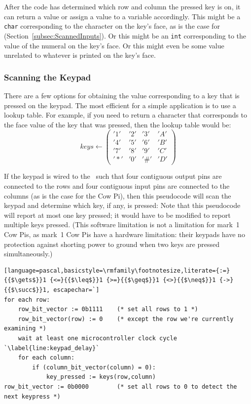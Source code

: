 After the code has determined which row and column the pressed key is on, it can return a value or assign a value to a variable accordingly.
This might be a \lstinline{char} corresponding to the character on the key's face, as is the case for  (Section~\ref{subsec:ScannedInputs}).
Or this might be an \lstinline{int} corresponding to the value of the numeral on the key's face.
Or this might even be some value unrelated to whatever is printed on the key's face.

\subsubsection{Scanning the Keypad}

There are a few options for obtaining the value corresponding to a key that is pressed on the keypad.
The most efficient for a simple application is to use a lookup table.
For example, if you need to return a character that corresponds to the face value of the key that was pressed, then the lookup table would be:
\[
    keys \gets
    \left(\begin{array}{cccc}
              '1' & '2' & '3' & 'A' \\
              '4' & '5' & '6' & 'B' \\
              '7' & '8' & '9' & 'C' \\
              '*' & '0' & '\#' & 'D'
    \end{array}\right)
\]

If the keypad is wired to the \mcuboard\ such that four contiguous output pins are connected to the rows and four contiguous input pins are connected to the columns (as is the case for the Cow Pi), then this pseudocode will scan the keypad and determine which key, if any, is pressed:
Note that this pseudocode will report at most one key pressed;
it would have to be modified to report multiple keys pressed.
(This software limitation is not a limitation for mark~1 Cow Pis, as mark~1 Cow Pis have a hardware limitation:
their keypads have no protection against shorting power to ground when two keys are pressed simultaneously.)

\begin{lstlisting}[language=pascal,basicstyle=\rmfamily\footnotesize,literate={:=}{{$\gets$}}1 {<=}{{$\leq$}}1 {>=}{{$\geq$}}1 {<>}{{$\neq$}}1 {->}{{$\succ$}}1, escapechar=`]
for each row:
    row_bit_vector := 0b1111    (* set all rows to 1 *)
    row_bit_vector(row) := 0    (* except the row we're currently examining *)
    wait at least one microcontroller clock cycle   `\label{line:keypad_delay}`
    for each column:
        if (column_bit_vector(column) = 0):
            key_pressed := keys(row,column)
row_bit_vector := 0b0000        (* set all rows to 0 to detect the next keypress *)
\end{lstlisting}

